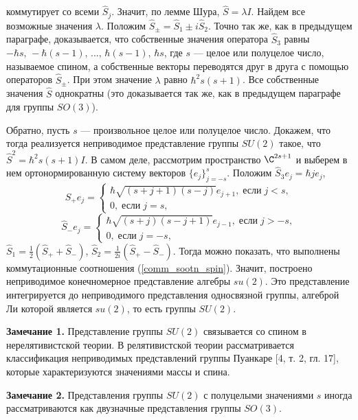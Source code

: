 \documentclass[a4paper
]{article}
\begin{document}
коммутирует со всеми $\hat S_j$. Значит, по лемме Шура, $\hat S=\lambda I$.
Найдем все возможные значения $\lambda$. Положим $\hat S_\pm=\hat S_1
\pm i\hat S_2$. Точно так же, как в предыдущем параграфе, доказывается,
что собственные значения оператора $\hat S_3$ равны $-\hbar s, \,
-\hbar (s-1), \, \dots, \, \hbar(s-1), \, \hbar s$, где $s$ --- целое
или полуцелое число, называемое спином, а собственные векторы переводятся
друг в друга с помощью операторов $\hat S_\pm$. При этом значение $\lambda$
равно $\hbar^2 s(s+1)$. Все собственные значения $\hat S$ однократны
(это доказывается так же, как в предыдущем параграфе для группы
$SO(3)$). \par
Обратно, пусть $s$ --- произвольное целое или полуцелое число.
Докажем, что тогда реализуется неприводимое представление группы
$SU(2)$ такое, что $\hat S^2=\hbar^2 s(s+1)I$. В самом деле, рассмотрим
пространство $\C^{2s+1}$ и выберем в нем ортонормированную систему
векторов $\{e_j\}_{j=-s}^{s}$. Положим $\hat S_3e_j=\hbar je_j$,
$$\hat S_+e_j=\left\{ \begin{array}{l} \hbar \sqrt{(s+j+1)(s-j)}e_{j+1},
\; \text{если} \; j<s,\\ 0, \; \text{если}\;
j=s,\end{array}\right. $$$$ \hat S_-e_j=\left\{ \begin{array}{l}
\hbar \sqrt{(s+j)(s-j+1)} e_{j-1}, \; \text{если} \; j>-s,\\ 0, \;
\text{если}\; j=-s,\end{array}\right.$$ $\hat S_1=\frac12 (\hat
S_++\hat S_-)$, $\hat S_2=\frac{1}{2i}(\hat S_+ -\hat S_-)$. Тогда
можно показать, что выполнены коммутационные соотношения
(\ref{comm_sootn_spin}). Значит, построено неприводимое
конечномерное представление алгебры $su(2)$. Это представление
интегрируется до неприводимого представления односвязной группы,
алгеброй Ли которой является $su(2)$, то есть группы $SU(2)$. \par
{\bf Замечание 1.} Представление группы $SU(2)$ связывается со
спином в нерелятивистской теории. В релятивистской теории
рассматривается классификация неприводимых представлений группы
Пуанкаре [4, т. 2, гл. 17], которые характеризуются
значениями массы и спина. \par {\bf Замечание 2.} Представления
группы $SU(2)$ с полуцелыми значениями $s$ иногда рассматриваются
как двузначные представления группы $SO(3)$.
\end{document}
